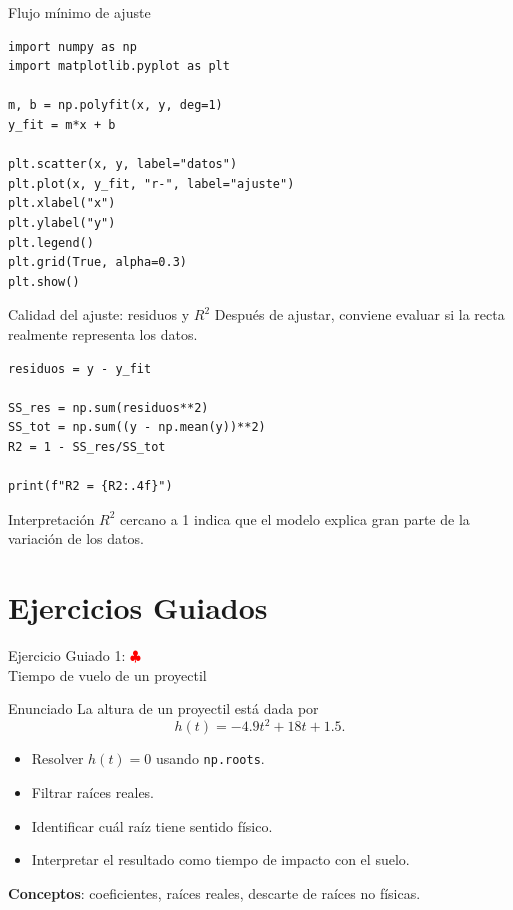 \documentclass[10pt]{beamer}
\begin{document}
\begin{frame}[fragile]{Flujo mínimo de ajuste}
\begin{verbatim}
import numpy as np
import matplotlib.pyplot as plt

m, b = np.polyfit(x, y, deg=1)
y_fit = m*x + b

plt.scatter(x, y, label="datos")
plt.plot(x, y_fit, "r-", label="ajuste")
plt.xlabel("x")
plt.ylabel("y")
plt.legend()
plt.grid(True, alpha=0.3)
plt.show()
\end{verbatim}
\end{frame}

\begin{frame}[fragile]{Calidad del ajuste: residuos y \(R^2\)}
  Después de ajustar, conviene evaluar si la recta realmente representa los datos.

\begin{verbatim}
residuos = y - y_fit

SS_res = np.sum(residuos**2)
SS_tot = np.sum((y - np.mean(y))**2)
R2 = 1 - SS_res/SS_tot

print(f"R2 = {R2:.4f}")
\end{verbatim}

  \begin{block}{Interpretación}
    \(R^2\) cercano a 1 indica que el modelo explica gran parte de la variación de los datos.
  \end{block}
\end{frame}

\section{Ejercicios Guiados}

\begin{frame}{Ejercicio Guiado 1: \hfill \textcolor{red}{$\clubsuit$} \\ Tiempo de vuelo de un proyectil}
  \begin{block}{Enunciado}
    La altura de un proyectil está dada por
    \[
      h(t) = -4.9t^2 + 18t + 1.5.
    \]
    \begin{itemize}
      \item Resolver \(h(t)=0\) usando \texttt{np.roots}.
      \item Filtrar raíces reales.
      \item Identificar cuál raíz tiene sentido físico.
      \item Interpretar el resultado como tiempo de impacto con el suelo.
    \end{itemize}
  \end{block}

  \textbf{Conceptos}: coeficientes, raíces reales, descarte de raíces no físicas.
\end{frame}
\end{document}
